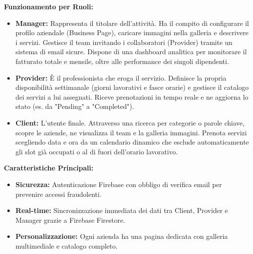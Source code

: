 \documentclass[12pt]{article}
\begin{document}
\textbf{Funzionamento per Ruoli:}
\begin{itemize}[noitemsep]
    \item \textbf{Manager:} Rappresenta il titolare dell'attività. Ha il compito di configurare il profilo aziendale (Business Page), caricare immagini nella galleria e descrivere i servizi. Gestisce il team invitando i collaboratori (Provider) tramite un sistema di email sicure. Dispone di una dashboard analitica per monitorare il fatturato totale e mensile, oltre alle performance dei singoli dipendenti.
    \item \textbf{Provider:} È il professionista che eroga il servizio. Definisce la propria disponibilità settimanale (giorni lavorativi e fasce orarie) e gestisce il catalogo dei servizi a lui assegnati. Riceve prenotazioni in tempo reale e ne aggiorna lo stato (es. da "Pending" a "Completed").
    \item \textbf{Client:} L'utente finale. Attraverso una ricerca per categorie o parole chiave, scopre le aziende, ne visualizza il team e la galleria immagini. Prenota servizi scegliendo data e ora da un calendario dinamico che esclude automaticamente gli slot già occupati o al di fuori dell'orario lavorativo.
\end{itemize}

\textbf{Caratteristiche Principali:}
\begin{itemize}[noitemsep]
    \item \textbf{Sicurezza:} Autenticazione Firebase con obbligo di verifica email per prevenire accessi fraudolenti.
    \item \textbf{Real-time:} Sincronizzazione immediata dei dati tra Client, Provider e Manager grazie a Firebase Firestore.
    \item \textbf{Personalizzazione:} Ogni azienda ha una pagina dedicata con galleria multimediale e catalogo completo.
\end{itemize}
\end{document}
